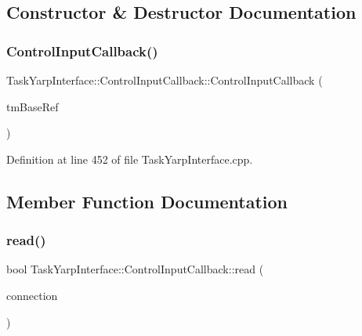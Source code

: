 \subsection{Constructor \& Destructor Documentation}
\hypertarget{classocra_1_1TaskYarpInterface_1_1ControlInputCallback_aab25b522726df43c6358ac435af4a502}{}\label{classocra_1_1TaskYarpInterface_1_1ControlInputCallback_aab25b522726df43c6358ac435af4a502} 
\subsubsection{\texorpdfstring{Control\+Input\+Callback()}{ControlInputCallback()}}
{\footnotesize\ttfamily Task\+Yarp\+Interface\+::\+Control\+Input\+Callback\+::\+Control\+Input\+Callback (\begin{DoxyParamCaption}\item[{\hyperlink{classocra_1_1TaskYarpInterface}{Task\+Yarp\+Interface} \&}]{tm\+Base\+Ref }\end{DoxyParamCaption})}



Definition at line 452 of file Task\+Yarp\+Interface.\+cpp.



\subsection{Member Function Documentation}
\hypertarget{classocra_1_1TaskYarpInterface_1_1ControlInputCallback_a6b2e8af58d4625a70ea6f8217287be07}{}\label{classocra_1_1TaskYarpInterface_1_1ControlInputCallback_a6b2e8af58d4625a70ea6f8217287be07} 
\subsubsection{\texorpdfstring{read()}{read()}}
{\footnotesize\ttfamily bool Task\+Yarp\+Interface\+::\+Control\+Input\+Callback\+::read (\begin{DoxyParamCaption}\item[{yarp\+::os\+::\+Connection\+Reader \&}]{connection }\end{DoxyParamCaption})\hspace{0.3cm}{\ttfamily [virtual]}}



